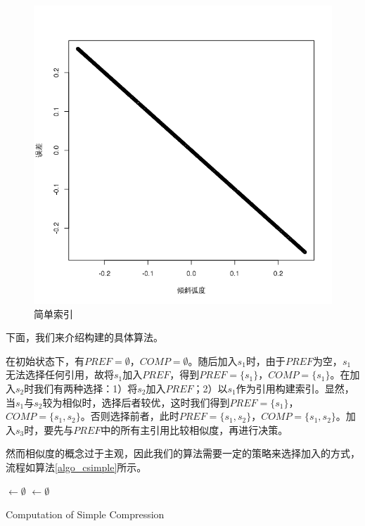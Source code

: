 ﻿\documentclass{sysuthesis}
\begin{document}
\begin{figure}[htbp]
\centering
\includegraphics[scale=0.3]{image/err_ref.png}
\caption{简单索引}\label{imag_csimple}
\end{figure}

下面，我们来介绍构建的具体算法。\par
在初始状态下，有$PREF = \emptyset$，$COMP = \emptyset$。随后加入$s_{1}$时，由于$PREF$为空，$s_{1}$无法选择任何引用，故将$s_{1}$加入$PREF$，得到$PREF = \{s_{1}\}$，$COMP = \{s_{1}\}$。在加入$s_{2}$时我们有两种选择：1）将$s_{2}$加入$PREF$；2）以$s_{1}$作为引用构建索引。显然，当$s_{1}$与$s_{2}$较为相似时，选择后者较优，这时我们得到$PREF = \{s_{1}\}$，$COMP = \{s_{1}, s_{2}\}$。否则选择前者，此时$PREF = \{s_{1}, s_{2}\}$，$COMP = \{s_{1}, s_{2}\}$。加入$s_{3}$时，要先与$PREF$中的所有主引用比较相似度，再进行决策。\par
然而相似度的概念过于主观，因此我们的算法需要一定的策略来选择加入的方式，流程如算法\ref{algo_csimple}所示。\par

\begin{algorithm}[H]
	\PREF $\leftarrow \emptyset$\;
	\COMP $\leftarrow \emptyset$\;
	\caption{Computation of Simple Compression}\label{algo_csimple}
\end{algorithm}
\end{document}
